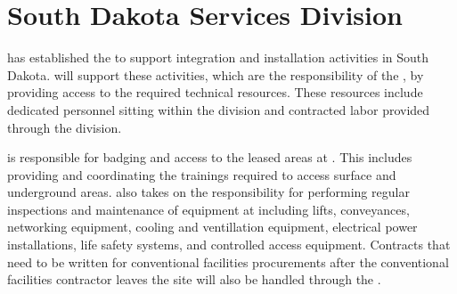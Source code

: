 \section{South Dakota Services Division}
\label{sec:fdsp-coord-host_facility_services}

 has established the  to support integration 
and installation activities in South Dakota.  will support 
these activities, which are the responsibility of the , 
by providing access to the required technical resources.  These 
resources include dedicated  personnel sitting within 
the division and contracted labor provided through the division.   

 is responsible for badging and access to the leased 
areas at . This includes providing and coordinating  
the trainings required to access surface and underground areas.  
 also takes on the responsibility for performing 
regular inspections and maintenance of  equipment 
at  including lifts, conveyances, networking equipment, 
cooling and ventillation equipment, electrical power installations, 
life safety systems, and controlled access equipment.  Contracts 
that need to be written for conventional facilities procurements 
after the  conventional facilities contractor leaves 
the site will also be handled through the .
